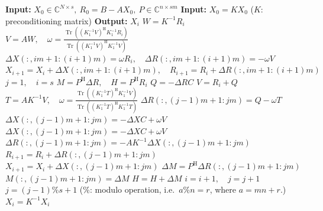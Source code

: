 \begin{algorithm}[H]\caption{{The preconditioned block IDR($s$) method}}\label{alg:preconditioned-block-idr}\begin{algorithmic}[1]
\Statex\textbf{Input:} $X_0\in\mathbb C^{N\times s},\ R_0=B-AX_0,\ P\in\mathbb C^{n\times sm}$
\Statex\textbf{Input:} $X_0=KX_0$ ($K$: {preconditioning matrix})
\Statex\textbf{Output:} $X_i$
\State $W=K^{-1}R_i$
\State $V=AW,\quad\omega=\frac{\operatorname{Tr}((K_1^{-1}V)^{\mathrm H}K_1^{-1}R_i)}{\operatorname{Tr}((K_1^{-1}V)^{\mathrm H}K_1^{-1}V)}$
\State $\Delta X(:,im+1:(i+1)m)=\omega R_i,\quad\Delta R(:,im+1:(i+1)m)=-\omega V$
\State $X_{i+1}=X_i+\Delta X(:,im+1:(i+1)m),\quad R_{i+1}=R_i+\Delta R(:,im+1:(i+1)m)$
\EndFor
\State $j=1,\quad i=s$
\State $M=P^{\mathrm H}\Delta R,\quad H=P^{\mathrm H}R_i$
\State $Q=-\Delta RC$
\State $V=R_i+Q$
\State $T=AK^{-1}V,\quad\omega=\frac{\operatorname{Tr}((K_1^{-1}T)^{\mathrm H}K_1^{-1}V)}{\operatorname{Tr}((K_1^{-1}T)^{\mathrm H}K_1^{-1}T)}$
\State $\Delta R(:,(j-1)m+1:jm)=Q-\omega T$
\State $\Delta X(:,(j-1)m+1:jm)=-\Delta XC+\omega V$
\Else
\State $\Delta X(:,(j-1)m+1:jm)=-\Delta XC+\omega V$
\State $\Delta R(:,(j-1)m+1:jm)=-AK^{-1}\Delta X(:,(j-1)m+1:jm)$
\EndIf
\State $R_{i+1}=R_i+\Delta R(:,(j-1)m+1:jm)$
\State $X_{i+1}=X_i+\Delta X(:,(j-1)m+1:jm)$
\State $\Delta M=P^{\mathrm H}\Delta R(:,(j-1)m+1:jm)$
\State $M(:,(j-1)m+1:jm)=\Delta M$
\State $H=H+\Delta M$
\State $i=i+1,\quad j=j+1$
\State $j=(j-1)\%s+1$ ({$\%$: modulo operation, i.e.\ $a\%n=r$, where $a=mn+r$.})
\EndFor\EndWhile
\State $X_i=K^{-1}X_i$
\end{algorithmic}\end{algorithm}
